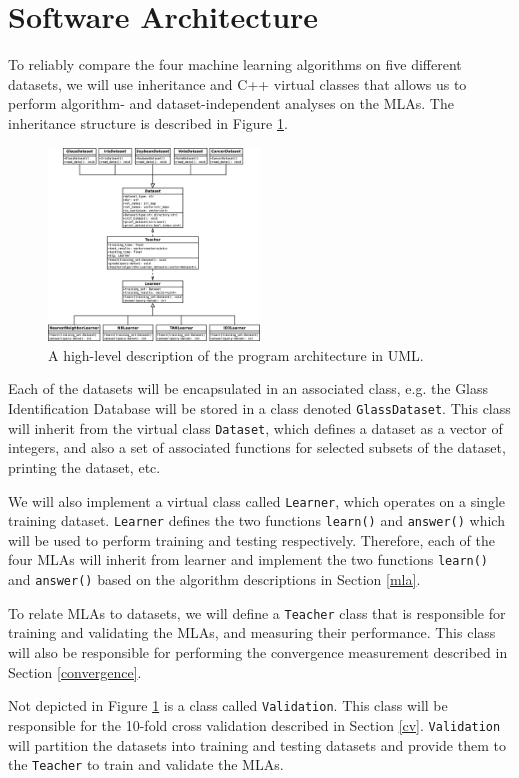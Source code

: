 \documentclass{article}
\begin{document}
	\section{Software Architecture}
		To reliably compare the four machine learning algorithms on five different datasets, we will use inheritance and C++ virtual classes that allows us to perform algorithm- and dataset-independent analyses on the MLAs. 
		The inheritance structure is described in Figure \ref{uml}.
		\begin{figure}[h]
			\centering
			\includegraphics[width=0.5\textwidth]{fig/UML_Design}
			\caption{A high-level description of the program architecture in UML.}
			\label{uml}
		\end{figure}	
		Each of the datasets will be encapsulated in an associated class, e.g. the Glass Identification Database will be stored in a class denoted \texttt{GlassDataset}. 
		This class will inherit from the virtual class \texttt{Dataset}, which defines a dataset as a vector of integers, and also a set of associated functions for selected subsets of the dataset, printing the dataset, etc.
		
		We will also implement a virtual class called \texttt{Learner}, which operates on a single training dataset. 
		\texttt{Learner} defines the two functions \texttt{learn()} and \texttt{answer()} which will be used to perform training and testing respectively. 
		Therefore, each of the four MLAs will inherit from learner and implement the two functions \texttt{learn()} and \texttt{answer()} based on the algorithm descriptions in Section \ref{mla}. 
		
		To relate MLAs to datasets, we will define a \texttt{Teacher} class that is responsible for training and validating the MLAs, and measuring their performance. 
		This class will also be responsible for performing the convergence measurement described in Section \ref{convergence}.
		
		Not depicted in Figure \ref{uml} is a class called \texttt{Validation}. 
		This class will be responsible for the 10-fold cross validation described in Section \ref{cv}. 
		\texttt{Validation} will partition the datasets into training and testing datasets and provide them to the \texttt{Teacher} to train and validate the MLAs.
\end{document}
